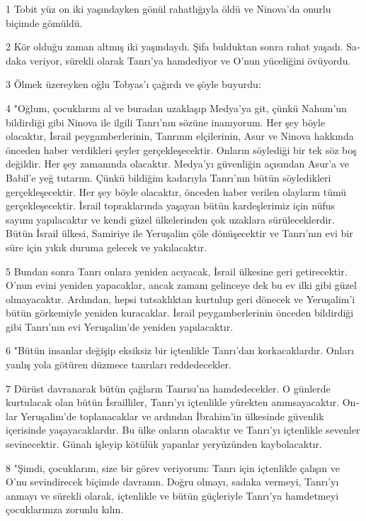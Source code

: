 \par 1 Tobit yüz on iki yaşındayken gönül rahatlığıyla öldü ve Ni­nova'da onurlu biçimde gömüldü.
\par 2 Kör olduğu zaman altmış iki yaşındaydı. Şifa bulduktan sonra rahat yaşadı. Sa­daka veriyor, sürekli olarak Tanrı'ya hamdediyor ve O'nun yüceliğini övü­yordu.
\par 3 Ölmek üzereyken oğlu Tobyas'ı çağırdı ve şöyle buyurdu:
\par 4 "Oğlum, çocuklarını al ve buradan uzaklaşıp Medya'ya git, çünkü Nahum'un bildirdiği gibi Ninova ile ilgili Tanrı'nın sözüne inanıyorum. Her şey böyle olacaktır, İsrail peygamberlerinin, Tanrı­nın elçilerinin, Asur ve Ninova hakkında önceden haber verdikleri şeyler gerçekleşecektir. Onların söylediği bir tek söz boş değildir. Her şey za­manında olacaktır. Medya'yı güvenli­ğin açısından Asur'a ve Babil'e yeğ tutarım. Çünkü bildiğim kadarıyla Tan­rı'nın bütün söyledikleri gerçekleşe­cektir. Her şey böyle olacaktır, önce­den haber verilen olayların tümü gerçekleşecektir. İsrail topraklarında yaşayan bütün kardeşlerimiz için nüfus sayımı yapılacaktır ve kendi güzel ülkelerinden çok uzaklara sürüleceklerdir. Bütün İsrail ülkesi, Samiriye ile Yeruşalim çöle dönüşecektir ve Tanrı'nın evi bir süre için yıkık duru­ma gelecek ve yakılacaktır.
\par 5 Bundan sonra Tanrı onlara yeniden acıyacak, İsrail ülkesine geri getirecektir. O'nun evini yeniden yapacaklar, ancak zamanı gelinceye dek bu ev ilki gibi gü­zel olmayacaktır. Ardından, hepsi tut­saklıktan kurtulup geri dönecek ve Yeruşalim'i bütün görkemiyle yeniden kuracaklar. İsrail peygamberleri­nin önceden bildirdiği gibi Tanrı'nın evi Yeruşalim'de yeniden yapılacak­tır.
\par 6 "Bütün insanlar değişip eksiksiz bir içtenlikle Tanrı'dan korkacaklar­dır. Onları yanlış yola götüren düzmece tanrıları reddedecekler.
\par 7 Dürüst davranarak bütün çağların Tanrısı'na hamdedecekler. O günlerde kurtulacak olan bütün İsrailliler, Tanrı'yı iç­tenlikle yürekten anımsayacaktır. On­lar Yeruşalim'de toplanacaklar ve ar­dından İbrahim'in ülkesinde güvenlik içerisinde yaşayacaklardır. Bu ülke on­ların olacaktır ve Tanrı'yı içtenlikle sevenler sevinecektir. Günah işleyip kötülük yapanlar yeryüzünden kaybo­lacaktır.
\par 8 "Şimdi, çocuklarım, size bir gö­rev veriyorum: Tanrı için içtenlikle çalışın ve O'nu sevindirecek biçimde davranın. Doğru olmayı, sadaka ver­meyi, Tanrı'yı anmayı ve sürekli ola­rak, içtenlikle ve bütün güçleriyle Tan­rı'ya hamdetmeyi çocuklarınıza zo­runlu kılın.
